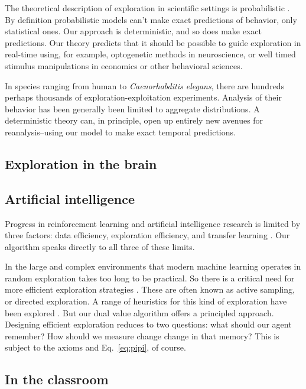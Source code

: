\documentclass[9pt,twocolumn,twoside]{pnas-new}
\begin{document}
The theoretical description of exploration in scientific settings is probabilistic \cite{Calhoun2014,Song2019a,Gershman2018b,Schulz2018a}. By definition probabilistic models can't make exact predictions of behavior, only statistical ones. Our approach is deterministic, and so does make exact predictions. Our theory predicts that it should be possible to guide exploration in real-time using, for example, optogenetic methods in neuroscience, or well timed stimulus manipulations in economics or other behavioral sciences. 

In species ranging from human to \textit{Caenorhabditis elegans}, there are hundreds perhaps thousands of exploration-exploitation experiments. Analysis of their behavior has been generally been limited to aggregate distributions. A deterministic theory can, in principle, open up entirely new avenues for reanalysis--using our model to make exact temporal predictions.

\subsection*{Exploration in the brain}

\subsection*{Artificial intelligence}
Progress in reinforcement learning and artificial intelligence research is limited by three factors: data efficiency, exploration efficiency, and transfer learning \cite{Ha2018}. Our algorithm speaks directly to all three of these limits. 

In the large and complex environments that modern machine learning operates in random exploration takes too long to be practical. So there is a critical need for more efficient exploration strategies \cite{Ha2018}. These are often known as active sampling, or directed exploration. A range of heuristics for this kind of exploration have been explored \cite{Gottlieb2018,Epshteyn2008,Thrun1992b,Ishii2002a,Bellemare2016,Haarnoja2018}. But our dual value algorithm offers a principled approach. Designing efficient exploration reduces to two questions: what should our agent remember? How should we measure change change in that memory? This is subject to the axioms and Eq.~\ref{eq:pipi}, of course.

\subsection*{In the classroom}
\end{document}

